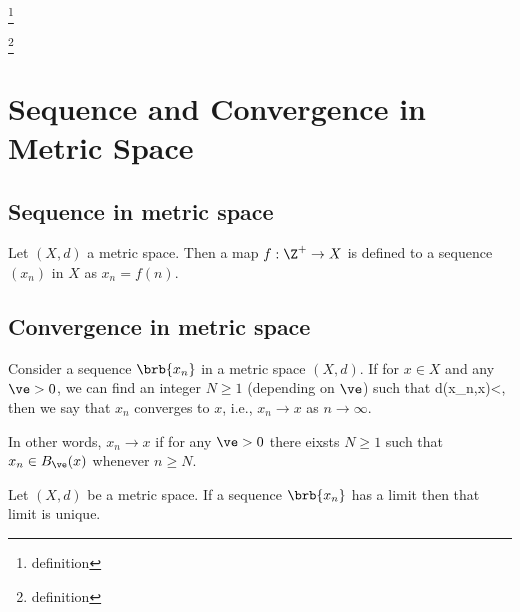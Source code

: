 \begin{definition}\label{def:euclidean_metric_space}
\footnote{definition}
\end{definition}

\begin{definition}\label{def:discrete_metric_space}
\footnote{definition}
\end{definition}





\section{Sequence and Convergence in Metric Space}


\subsection{Sequence in metric space}

\begin{definition}\label{def:sequence_metric_space}
Let $(X,d)$ a metric space. Then a map $f:\Z^+\to X$ is defined to a sequence $(x_n)$ in $X$ as $x_n = f(n)$.
\end{definition}

\subsection{Convergence in metric space}

\begin{definition}\label{def:limit_convergence_metric_space}
Consider a sequence $\brb{x_{n}}$ in a metric space $(X,d)$. If for $x\in X$ and any $\ve > 0$, we can find an integer $N\geq 1$ (depending on $\ve$) such that
\be
d(x_{n},x)<\ve \quad {},
\ee
then we say that $x_n$ converges to $x$, i.e., $x_{n} \to x$ as $n\to\infty$.

In other words, $x_{n} \to x$ if for any $\ve>0$ there eixsts $N\geq 1$ such that $x_n\in B_\ve(x)$ whenever $n\geq N$.
\end{definition}

\begin{theorem}\label{thm:limit_unique_metric_space}
Let $(X,d)$ be a metric space. If a sequence $\brb{x_{n}}$ has a limit then that limit is unique.
\end{theorem}

